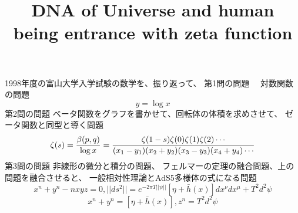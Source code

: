 \documentclass{jsarticle}
\begin{document}
\title{DNA of Universe and human  \\
being entrance with zeta function}
\author{}
\date{}
\maketitle
   \newcommand{\variint}{%
	\begin{picture}(15,30)
		\put(0,0){
			$ \iint $}
		\put(0,5){\line(15,0){15}}
	\end{picture} %
}

\newcommand{\variiint}{%
	\begin{picture}(15,15)
		\put(0,0){
			$ \iiint $}
		\put(0,5){\line(15,0){20}}
	\end{picture} %
}



 \newcommand{\alearletter}{%
	 \begin{picture}(10,20)
		 \put(0,0){
			 $ \square $}
		 \put(0,0){\line(1,1){10}}
	 \end{picture} %
	 }

 \newcommand{\secproduct}{%
	 \begin{picture}(10,20)
		 \put(0,0){
			 $ \nabla $}
		 \put(5,0){+}
	 \end{picture} %
	 }
 \newcommand{\talot}{%
	 \begin{picture}(15,20)
		 \put(0,0){
			 $ \text{\scalebox{2.0}[2]{$\nabla$}}$}
		 \put(5,3){
			 $ \Delta $}
	 \end{picture} %
	 }
 \newcommand{\hazerdnabla}{%
	 \begin{picture}(15,20)
		 \put(0,0){
			 $ \text{\scalebox{2.0}[2]{$\nabla$}}$}
		 \put(5,3){
			 $\text{Y}  $}
	 \end{picture} %
	 }

1998年度の富山大学入学試験の数学を、振り返って、
         第1問の問題　
	 対数関数の問題
         $$ y = \log x $$
	 第2問の問題
	 ベータ関数をグラフを書かせて、回転体の体積を求めさせて、
	 ゼータ関数と同型と導く問題
	 $$ \zeta(s) = {\beta(p,q) \over {\log x}} = 
	 {{\zeta(1-s)\zeta(0)\zeta(1)\zeta(2)\cdots } \over {(x_{1} - y_{1}) 
	 (x_{2} + y_{2})(x_{3} - y_{3})(x_{4} + y_{4})\cdots }} $$
	 第3問の問題
	 非線形の微分と積分の問題、
	 フェルマーの定理の融合問題、上の問題を融合させると、
	 一般相対性理論とAdS5多様体の式になる問題
	 $$ x^{n} + y^{n} -n xyz = 0, ||ds^2|| = e^{-2\pi T||\psi||}
	 [\eta + \bar{h}(x)]dx^{\nu}dx^{\mu} + T^2d^2 \psi $$
	 $$ x^n + y^n = [\eta + \bar{h}(x)],  z^n = T^2d^2 \psi $$
\end{document}
